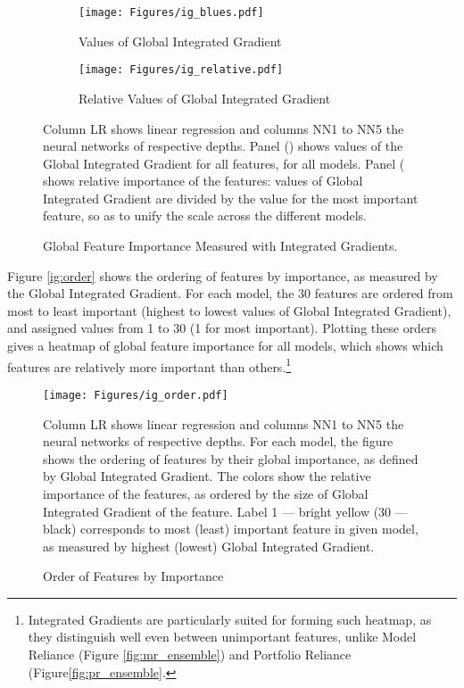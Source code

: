 		\begin{figure}	
			\centering		
			\begin{subfigure}[t]{\textwidth}
				\texttt{[image: Figures/ig\_blues.pdf]}
				\caption{Values of Global Integrated Gradient}
				\label{fig:ig_blues}
			\end{subfigure}
		
			\begin{subfigure}[t]{\textwidth}
				\centering
				\texttt{[image: Figures/ig\_relative.pdf]}
				\caption{Relative Values of Global Integrated Gradient}
				\label{fig:ig_relative}
			\end{subfigure}
			\caption{Global Feature Importance Measured with Integrated Gradients.}
			\medskip
			\small
			Column LR shows linear regression and columns NN1 to NN5 the neural networks of respective depths. Panel () shows values of the Global Integrated Gradient for all features, for all models.  Panel ( shows relative importance of the features: values of Global Integrated Gradient are divided by the value for the most important feature, so as to unify the scale across the different models.
			\label{fig:ig_ensemble}
		\end{figure}
		
		
		Figure \ref{ig:order} shows the ordering of features by importance, as measured by the Global Integrated Gradient. For each model, the 30 features are ordered from most to least important (highest to lowest values of Global Integrated Gradient), and assigned values from 1 to 30 (1 for most important). Plotting these orders gives a heatmap of global feature importance for all models, which shows which features are relatively more important than others.\footnote{Integrated Gradients are particularly suited for forming such heatmap, as they distinguish well even between unimportant features, unlike Model Reliance (Figure \ref{fig:mr_ensemble}) and Portfolio Reliance (Figure\ref{fig:pr_ensemble}.}
		
		\begin{figure}
			\centering
			\texttt{[image: Figures/ig\_order.pdf]}
			\caption{Order of Features by Importance}
			\label{fig:ig_order}
			\medskip
			\small
			Column LR shows linear regression and columns NN1 to NN5 the neural networks of respective depths.
			For each model, the figure shows the ordering of features by their global importance, as defined by Global Integrated Gradient. The colors show the relative importance of the features, as ordered by the size of Global Integrated Gradient of the feature. Label 1 --- bright yellow (30 --- black) corresponds to most (least) important feature in given model, as measured by highest (lowest) Global Integrated Gradient.
		\end{figure}
		
